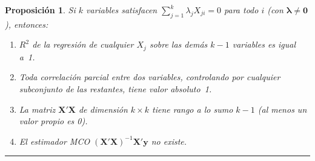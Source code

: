 \documentclass[12pt, letterpaper]{article}
\newtheorem{prop}{Proposición}
\theoremstyle{remark}
\begin{document}
\begin{prop}
  Si $k$ variables satisfacen $\sum_{j=1}^k \lambda_j X_{ji} = 0$ para todo $i$
  (con $\boldsymbol{\lambda} \neq \mathbf{0}$), entonces:
  \begin{enumerate}[label=(\roman*), itemsep=3pt]
    \item $R^2$ de la regresión de cualquier $X_j$ sobre las demás $k-1$
      variables es igual a~1.
    \item Toda correlación parcial entre dos variables, controlando por
      cualquier subconjunto de las restantes, tiene valor absoluto~1.
    \item La matriz $\mathbf{X'X}$ de dimensión $k\times k$ tiene rango
      a lo sumo $k-1$ (al menos un valor propio es 0).
    \item El estimador MCO $(\mathbf{X'X})^{-1}\mathbf{X'y}$ no existe.
  \end{enumerate}
\end{prop}

\vspace{18pt}
\noindent\rule{\linewidth}{0.4pt}

\end{document}

